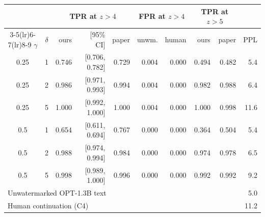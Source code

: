 \begin{tabular}{@{}cc rrr rr rr r@{}}
\toprule
 & & \multicolumn{3}{c}{TPR at $z>4$} & \multicolumn{2}{c}{FPR at $z>4$} & \multicolumn{2}{c}{TPR at $z>5$} & \\
\cmidrule(lr){3-5}\cmidrule(lr){6-7}\cmidrule(lr){8-9}
$\gamma$ & $\delta$ & ours & [95\% CI] & paper & unwm. & human & ours & paper & PPL \\
\midrule
0.25 & 1 & 0.746 & [0.706, 0.782] & 0.729 & 0.004 & 0.000 & 0.494 & 0.482 & 5.4 \\
0.25 & 2 & 0.986 & [0.971, 0.993] & 0.994 & 0.004 & 0.000 & 0.982 & 0.988 & 6.4 \\
0.25 & 5 & 1.000 & [0.992, 1.000] & 1.000 & 0.004 & 0.000 & 1.000 & 0.998 & 11.6 \\
0.5 & 1 & 0.654 & [0.611, 0.694] & 0.767 & 0.000 & 0.000 & 0.364 & 0.504 & 5.4 \\
0.5 & 2 & 0.988 & [0.974, 0.994] & 0.984 & 0.000 & 0.000 & 0.974 & 0.978 & 6.5 \\
0.5 & 5 & 0.998 & [0.989, 1.000] & 0.996 & 0.000 & 0.000 & 0.992 & 0.992 & 9.2 \\
\midrule
\multicolumn{9}{l}{Unwatermarked OPT-1.3B text} & 5.0 \\
\multicolumn{9}{l}{Human continuation (C4)} & 11.2 \\
\bottomrule
\end{tabular}